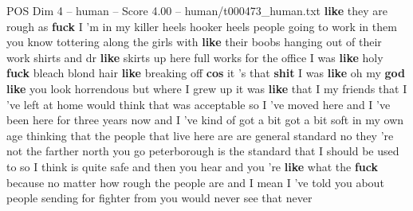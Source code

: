 \begin{textsample}{POS Dim 4 – human – Score 4.00 – human/t000473\_human.txt}  \label{ex:f4_pos_006}
\textbf{like} they are rough as \textbf{fuck} I 'm in my killer heels hooker heels people going to work in them you know tottering along the girls with \textbf{like} their boobs hanging out of their work shirts and dr \textbf{like} skirts up here full works for the office I was \textbf{like} holy \textbf{fuck} bleach blond hair \textbf{like} breaking off \textbf{cos} it 's that \textbf{shit} I was \textbf{like} oh my \textbf{god} \textbf{like} you look horrendous but where I grew up it was \textbf{like} that I my friends that I 've left at home would think that was acceptable so I 've moved here and I 've been here for three years now and I 've kind of got a bit got a bit soft in my own age thinking that the people that live here are are general standard no they 're not the farther north you go peterborough is the standard that I should be used to so I think is quite safe and then you hear and you 're \textbf{like} what the \textbf{fuck} because no matter how rough the people are and I mean I 've told you about people sending for fighter from you would never see that never

\end{textsample}
